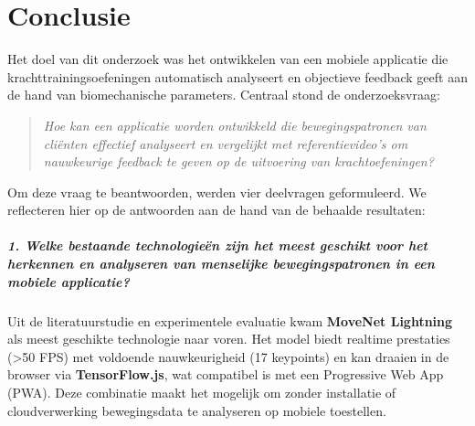 
\chapter{Conclusie}%
\label{ch:conclusie}


Het doel van dit onderzoek was het ontwikkelen van een mobiele applicatie die krachttrainingsoefeningen automatisch analyseert en objectieve feedback geeft aan de hand van biomechanische parameters. 
Centraal stond de onderzoeksvraag:

\begin{quote}
\textit{Hoe kan een applicatie worden ontwikkeld die bewegingspatronen van cliënten effectief analyseert en vergelijkt met referentievideo’s om nauwkeurige feedback te geven op de uitvoering van krachtoefeningen?}
\end{quote}

Om deze vraag te beantwoorden, werden vier deelvragen geformuleerd. We reflecteren hier op de antwoorden aan de hand van de behaalde resultaten:

\paragraph{1. Welke bestaande technologieën zijn het meest geschikt voor het herkennen en analyseren van menselijke bewegingspatronen in een mobiele applicatie?}
Uit de literatuurstudie en experimentele evaluatie kwam \textbf{MoveNet Lightning} als meest geschikte technologie naar voren. Het model biedt realtime prestaties (>50 FPS) met voldoende nauwkeurigheid (17 keypoints) en kan draaien in de browser via \textbf{TensorFlow.js}, wat compatibel is met een Progressive Web App (PWA). Deze combinatie maakt het mogelijk om zonder installatie of cloudverwerking bewegingsdata te analyseren op mobiele toestellen.

